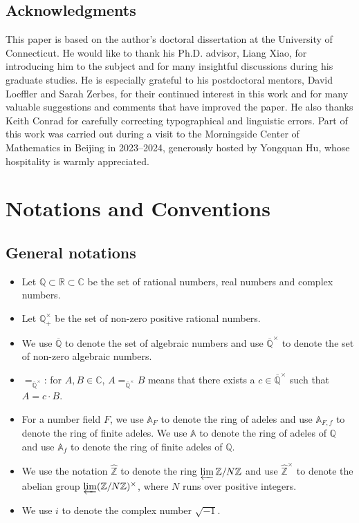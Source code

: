 \documentclass[11pt, a4paper]{amsart}
\theoremstyle{plain}
\theoremstyle{definition}
\numberwithin{equation}{section}
\def\AAA{\mathbb{A}}
\def\CC{\mathbb{C}}
\def\QQ{\mathbb{Q}}
\def\RR{\mathbb{R}}
\def\ZZ{\mathbb{Z}}
\begin{document}
\subsection*{Acknowledgments}
This paper is based on the author’s doctoral dissertation at the University of Connecticut. He would like to thank his Ph.D. advisor, Liang Xiao, for introducing him to the subject and for many insightful discussions during his graduate studies. He is especially grateful to his postdoctoral mentors, David Loeffler and Sarah Zerbes, for their continued interest in this work and for many valuable suggestions and comments that have improved the paper. He also thanks Keith Conrad for carefully correcting typographical and linguistic errors. Part of this work was carried out during a visit to the Morningside Center of Mathematics in Beijing in 2023–2024, generously hosted by Yongquan Hu, whose hospitality is warmly appreciated.



\section{Notations and Conventions}
\subsection*{General notations}

\begin{itemize}
    \item Let $\QQ \subset \RR \subset \CC$ be the set of rational numbers, real numbers and complex numbers. 
    \item Let $\QQ^{\times}_{+}$ be the set of non-zero positive rational numbers. 
    \item We use $\overline{\QQ}$ to denote the set of algebraic numbers and use $\overline{\QQ}^{\times}$ to denote the set of non-zero algebraic numbers. 
    \item $=_{\overline{\QQ}^{\times}}$: for $A, B \in \CC$, $A =_{\overline{\QQ}^{\times}} B$ means that there exists a $c \in \overline{\QQ}^{\times}$ such that $A = c \cdot B$. 
    \item For a number field $F$, we use $\AAA_{F}$ to denote the ring of adeles and use $\AAA_{F, f}$ to denote the ring of finite adeles. We use $\AAA$ to denote the ring of adeles of $\QQ$ and use $\AAA_{f}$ to denote the ring of finite adeles of $\QQ$.
    \item We use the notation $\hat{\ZZ}$ to denote the ring $\varprojlim \ZZ / N \ZZ$ and use $\hat{\ZZ}^{\times}$ to denote the abelian group $\varprojlim (\ZZ / N \ZZ)^{\times}$, where $N$ runs over positive integers.
    \item We use $i$ to denote the complex number $\sqrt{-1}$.
\end{itemize}
\end{document}
